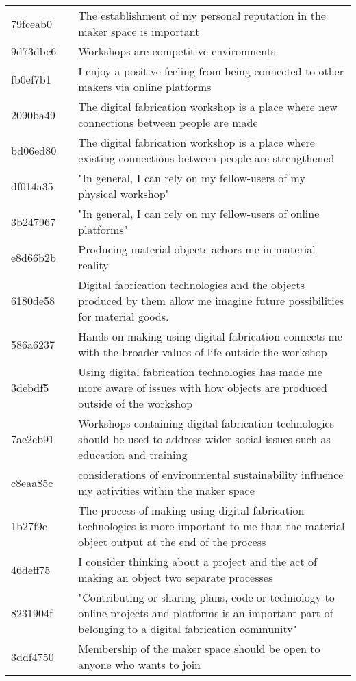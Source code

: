 \documentclass[a4paper,12pt]{article}\usepackage[]{graphicx}\usepackage[]{color}
\begin{document}
\begin{longtable}{H{72mm}m{0mm}m{75mm}}
  79fceab0 & \rule[-27mm]{0mm}{54mm} & The establishment of my personal reputation in the maker space is important \\ 
  9d73dbc6 & \rule[-27mm]{0mm}{54mm} & Workshops are competitive environments \\ 
  fb0ef7b1 & \rule[-27mm]{0mm}{54mm} & I enjoy a positive feeling from being connected to other makers via online platforms \\ 
  2090ba49 & \rule[-27mm]{0mm}{54mm} & The digital fabrication workshop is a place where new connections between people are made \\ 
  bd06ed80 & \rule[-27mm]{0mm}{54mm} & The digital fabrication workshop is a place where existing connections between people are strengthened \\ 
  df014a35 & \rule[-27mm]{0mm}{54mm} & "In general, I can rely on my fellow-users of my physical workshop" \\ 
  3b247967 & \rule[-27mm]{0mm}{54mm} & "In general, I can rely on my fellow-users of online platforms" \\ 
  e8d66b2b & \rule[-27mm]{0mm}{54mm} & Producing material objects achors me in material reality \\ 
  6180de58 & \rule[-27mm]{0mm}{54mm} & Digital fabrication technologies and the objects produced by them allow me imagine future possibilities for material goods. \\ 
  586a6237 & \rule[-27mm]{0mm}{54mm} & Hands on making using digital fabrication connects me with the broader values of life outside the workshop \\ 
  3debdf5 & \rule[-27mm]{0mm}{54mm} & Using digital fabrication technologies has made me more aware of issues with how objects are produced outside of the workshop \\ 
  7ae2cb91 & \rule[-27mm]{0mm}{54mm} & Workshops containing digital fabrication technologies should be used to address wider social issues such as education and training \\ 
  c8eaa85c & \rule[-27mm]{0mm}{54mm} & considerations of environmental sustainability influence my activities within the maker space \\ 
  1b27f9c & \rule[-27mm]{0mm}{54mm} & The process of making using digital fabrication technologies is more important to me than the material object output at the end of the process \\ 
  46deff75 & \rule[-27mm]{0mm}{54mm} & I consider thinking about a project and the act of making an object two separate processes  \\ 
  8231904f & \rule[-27mm]{0mm}{54mm} & "Contributing or sharing plans, code or technology to online projects and platforms is an important part of belonging to a digital fabrication community" \\ 
  3ddf4750 & \rule[-27mm]{0mm}{54mm} & Membership of the maker space should be open to anyone who wants to join \\ 
  \hline
\end{longtable}
\endgroup
\end{document}
